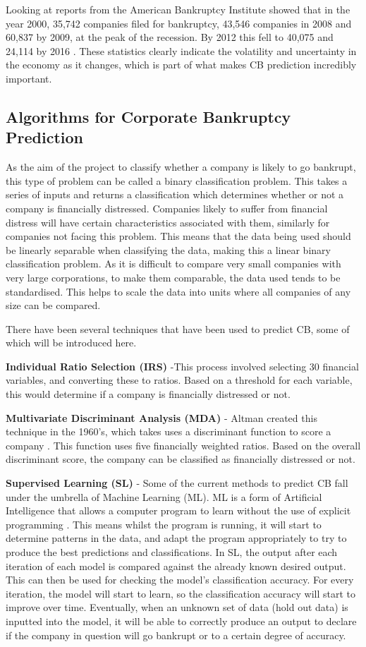 \documentclass[11pt]{article}
\begin{document}
Looking at reports from the American Bankruptcy Institute \cite{?} showed that in the year 2000, 35,742 companies filed for bankruptcy, 43,546 companies in 2008 and 60,837 by 2009, at the peak of the recession. By 2012 this fell to 40,075 and 24,114 by 2016 . These statistics clearly indicate the volatility and uncertainty in the economy as it changes, which is part of what makes CB prediction incredibly important.

\subsection{Algorithms for Corporate Bankruptcy Prediction}
As the aim of the project to classify whether a company is likely to go bankrupt, this type of problem can be called a binary classification problem. This takes a series of inputs and returns a classification which determines whether or not a company is financially distressed. Companies likely to suffer from financial distress will have certain characteristics associated with them, similarly for companies not facing this problem. This means that the data being used should be linearly separable when classifying the data, making this a linear binary classification problem. As it is difficult to compare very small companies with very large corporations, to make them comparable, the data used tends to be standardised. This helps to scale the data into units where all companies of any size can be compared. 

 There have been several techniques that have been used to predict CB, some of which will be introduced here.  

\textbf{Individual Ratio Selection (IRS)} -This process involved selecting 30 financial variables, and converting these to ratios. Based on a threshold for each variable, this would determine if a company is financially distressed or not.

\textbf{Multivariate Discriminant Analysis (MDA)} - Altman created this technique in the 1960's, which takes uses a discriminant function to score a company \cite{?}. This function uses five financially weighted ratios. Based on the overall discriminant score, the company can be classified as financially distressed or not.

\textbf{Supervised Learning (SL)} - Some of the current methods to predict CB fall under the umbrella of Machine Learning (ML). ML is a form of Artificial Intelligence that allows a computer program to learn without the use of explicit programming \cite{?}. This means whilst the program is running, it will start to determine patterns in the data, and adapt the program appropriately to try to produce the best predictions and classifications.
In SL, the output after each iteration of each model is compared against the already known desired output. This can then be used for checking the model's classification accuracy. For every iteration, the model will start to learn, so the classification accuracy will start to improve over time. Eventually, when an unknown set of data (hold out data) is inputted into the model, it will be able to correctly produce an output to declare if the company in question will go bankrupt or to a certain degree of accuracy.
\end{document}
